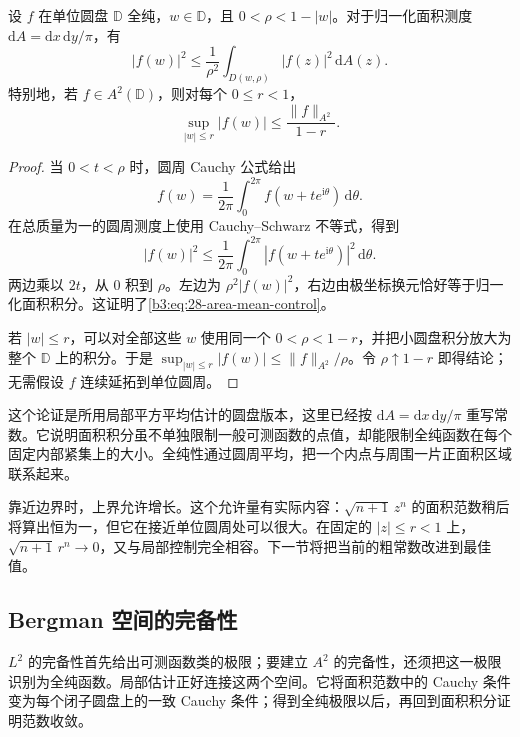 \begin{proposition}[面积平均对点值的控制]\label{b3:prop:28-area-local-control}
设 \(f\) 在单位圆盘 \(\mathbb D\) 全纯，\(w\in\mathbb D\)，且 \(0<\rho<1-|w|\)。对于归一化面积测度 \(\mathrm{d}A=\mathrm{d}x\,\mathrm{d}y/\pi\)，有
\begin{equation}\label{b3:eq:28-area-mean-control}
 |f(w)|^2\le\frac1{\rho^2}
 \int_{D(w,\rho)}|f(z)|^2\,\mathrm{d}A(z).
\end{equation}
特别地，若 \(f\in A^2(\mathbb D)\)，则对每个 \(0\le r<1\)，
\[
 \sup_{|w|\le r}|f(w)|\le\frac{\|f\|_{A^2}}{1-r}.
\]
\end{proposition}
\begin{proof}
当 \(0<t<\rho\) 时，圆周 Cauchy 公式给出
\[
 f(w)=\frac1{2\pi}\int_0^{2\pi}
 f(w+te^{\mathrm{i}\theta})\,\mathrm{d}\theta.
\]
在总质量为一的圆周测度上使用 Cauchy--Schwarz 不等式，得到
\[
 |f(w)|^2\le\frac1{2\pi}\int_0^{2\pi}
 |f(w+te^{\mathrm{i}\theta})|^2\,\mathrm{d}\theta.
\]
两边乘以 \(2t\)，从 \(0\) 积到 \(\rho\)。左边为 \(\rho^2|f(w)|^2\)，右边由极坐标换元恰好等于归一化面积积分。这证明了\eqref{b3:eq:28-area-mean-control}。

若 \(|w|\le r\)，可以对全部这些 \(w\) 使用同一个 \(0<\rho<1-r\)，并把小圆盘积分放大为整个 \(\mathbb D\) 上的积分。于是 \(\sup_{|w|\le r}|f(w)|\le\|f\|_{A^2}/\rho\)。令 \(\rho\uparrow1-r\) 即得结论；无需假设 \(f\) 连续延拓到单位圆周。
\end{proof}

这个论证是所用局部平方平均估计的圆盘版本，这里已经按 \(\mathrm{d}A=\mathrm{d}x\,\mathrm{d}y/\pi\) 重写常数。它说明面积积分虽不单独限制一般可测函数的点值，却能限制全纯函数在每个固定内部紧集上的大小。全纯性通过圆周平均，把一个内点与周围一片正面积区域联系起来。

\ProseParagraphBreak

靠近边界时，上界允许增长。这个允许量有实际内容：\(\sqrt{n+1}\,z^n\) 的面积范数稍后将算出恒为一，但它在接近单位圆周处可以很大。在固定的 \(|z|\le r<1\) 上，\(\sqrt{n+1}\,r^n\to0\)，又与局部控制完全相容。下一节将把当前的粗常数改进到最佳值。

\subsection{Bergman 空间的完备性}
\label{b3:subsec:280402}

\(L^2\) 的完备性首先给出可测函数类的极限；要建立 \(A^2\) 的完备性，还须把这一极限识别为全纯函数。局部估计正好连接这两个空间。它将面积范数中的 Cauchy 条件变为每个闭子圆盘上的一致 Cauchy 条件；得到全纯极限以后，再回到面积积分证明范数收敛。

